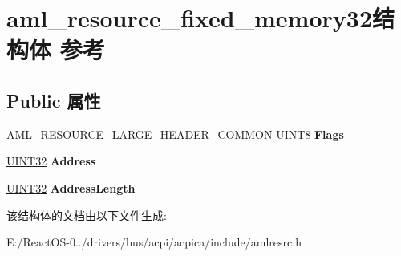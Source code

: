 \hypertarget{structaml__resource__fixed__memory32}{}\section{aml\+\_\+resource\+\_\+fixed\+\_\+memory32结构体 参考}
\label{structaml__resource__fixed__memory32}
\subsection*{Public 属性}
\begin{DoxyCompactItemize}
\item 
\mbox{\label{structaml__resource__fixed__memory32_a1f30331ae07b9ba55933098e5d5b0bdb}} 
A\+M\+L\+\_\+\+R\+E\+S\+O\+U\+R\+C\+E\+\_\+\+L\+A\+R\+G\+E\+\_\+\+H\+E\+A\+D\+E\+R\+\_\+\+C\+O\+M\+M\+ON \hyperlink{_processor_bind_8h_ab27e9918b538ce9d8ca692479b375b6a}{U\+I\+N\+T8} {\bfseries Flags}
\item 
\mbox{\label{structaml__resource__fixed__memory32_a93f35638e6eca519855670bb06988892}} 
\hyperlink{_processor_bind_8h_ae1e6edbbc26d6fbc71a90190d0266018}{U\+I\+N\+T32} {\bfseries Address}
\item 
\mbox{\label{structaml__resource__fixed__memory32_a507993018795f5327ddd8927b26fa3cd}} 
\hyperlink{_processor_bind_8h_ae1e6edbbc26d6fbc71a90190d0266018}{U\+I\+N\+T32} {\bfseries Address\+Length}
\end{DoxyCompactItemize}


该结构体的文档由以下文件生成\+:\begin{DoxyCompactItemize}
\item 
E\+:/\+React\+O\+S-\/0../drivers/bus/acpi/acpica/include/amlresrc.\+h\end{DoxyCompactItemize}
